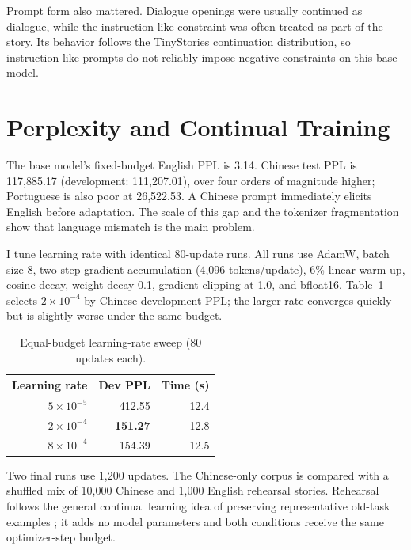 \documentclass[11pt]{article}
\begin{document}
Prompt form also mattered. Dialogue openings were usually continued as dialogue, while the
instruction-like constraint was often treated as part of the story. Its behavior follows the
TinyStories continuation distribution, so instruction-like prompts do not reliably impose
negative constraints on this base model.

\section{Perplexity and Continual Training}

The base model's fixed-budget English PPL is 3.14. Chinese test PPL is 117,885.17
(development: 111,207.01), over four orders of magnitude higher; Portuguese is also poor
at 26,522.53. A Chinese prompt immediately elicits English before adaptation. The scale of
this gap and the tokenizer fragmentation show that language mismatch is the main problem.

I tune learning rate with identical 80-update runs. All runs use AdamW, batch size 8,
two-step gradient accumulation (4,096 tokens/update), 6\% linear warm-up, cosine decay,
weight decay 0.1, gradient clipping at 1.0, and bfloat16. Table~\ref{tab:lr} selects
$2\times10^{-4}$ by Chinese development PPL; the larger rate converges quickly but is
slightly worse under the same budget.

\begin{table}[t]
\centering
\small
\begin{tabular}{rrr}
\toprule
Learning rate & Dev PPL & Time (s) \\
\midrule
$5\times10^{-5}$ & 412.55 & 12.4 \\
$2\times10^{-4}$ & \textbf{151.27} & 12.8 \\
$8\times10^{-4}$ & 154.39 & 12.5 \\
\bottomrule
\end{tabular}
\caption{Equal-budget learning-rate sweep (80 updates each).}
\label{tab:lr}
\end{table}

Two final runs use 1,200 updates. The Chinese-only corpus is compared with a shuffled mix of
10,000 Chinese and 1,000 English rehearsal stories. Rehearsal follows the general continual
learning idea of preserving representative old-task examples \citep{lopezpaz2017gem}; it
adds no model parameters and both conditions receive the same optimizer-step budget.
\end{document}

